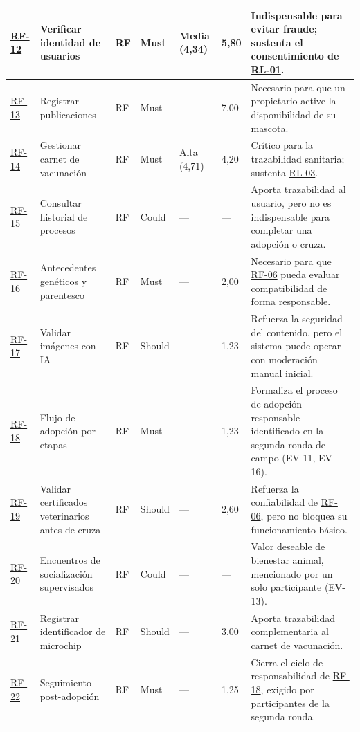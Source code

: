 \documentclass[journal,onecolumn]{IEEEtran}
\begin{document}
\begin{landscape}
\begin{longtable}{@{}p{1.2cm} p{5.2cm} p{1.0cm} p{1.3cm} p{1.3cm} p{1.1cm} p{6.5cm}@{}}
			\hyperref[tab:RF-12]{RF-12} & Verificar identidad de usuarios & RF & Must & Media (4,34) & 5,80 & Indispensable para evitar fraude; sustenta el consentimiento de \hyperref[rl:01]{RL-01}. \\ \midrule
			\hyperref[tab:RF-13]{RF-13} & Registrar publicaciones & RF & Must & --- & 7,00 & Necesario para que un propietario active la disponibilidad de su mascota. \\ \midrule
			\hyperref[tab:RF-14]{RF-14} & Gestionar carnet de vacunación & RF & Must & Alta (4,71) & 4,20 & Crítico para la trazabilidad sanitaria; sustenta \hyperref[rl:03]{RL-03}. \\ \midrule
			\hyperref[tab:RF-15]{RF-15} & Consultar historial de procesos & RF & Could & --- & --- & Aporta trazabilidad al usuario, pero no es indispensable para completar una adopción o cruza. \\ \midrule
			\hyperref[tab:RF-16]{RF-16} & Antecedentes genéticos y parentesco & RF & Must & --- & 2,00 & Necesario para que \hyperref[tab:RF-06]{RF-06} pueda evaluar compatibilidad de forma responsable. \\ \midrule
			\hyperref[tab:RF-17]{RF-17} & Validar imágenes con IA & RF & Should & --- & 1,23 & Refuerza la seguridad del contenido, pero el sistema puede operar con moderación manual inicial. \\ \midrule
			\hyperref[tab:RF-18]{RF-18} & Flujo de adopción por etapas & RF & Must & --- & 1,23 & Formaliza el proceso de adopción responsable identificado en la segunda ronda de campo (EV-11, EV-16). \\ \midrule
			\hyperref[tab:RF-19]{RF-19} & Validar certificados veterinarios antes de cruza & RF & Should & --- & 2,60 & Refuerza la confiabilidad de \hyperref[tab:RF-06]{RF-06}, pero no bloquea su funcionamiento básico. \\ \midrule
			\hyperref[tab:RF-20]{RF-20} & Encuentros de socialización supervisados & RF & Could & --- & --- & Valor deseable de bienestar animal, mencionado por un solo participante (EV-13). \\ \midrule
			\hyperref[tab:RF-21]{RF-21} & Registrar identificador de microchip & RF & Should & --- & 3,00 & Aporta trazabilidad complementaria al carnet de vacunación. \\ \midrule
			\hyperref[tab:RF-22]{RF-22} & Seguimiento post-adopción & RF & Must & --- & 1,25 & Cierra el ciclo de responsabilidad de \hyperref[tab:RF-18]{RF-18}, exigido por participantes de la segunda ronda. \\ \midrule

\end{longtable}
\end{landscape}
\end{document}
